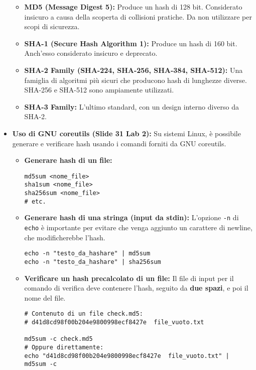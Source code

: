 \begin{itemize}
    \begin{itemize}
        \item \textbf{MD5 (Message Digest 5):} Produce un hash di 128 bit. Considerato insicuro a causa della scoperta di collisioni pratiche. Da non utilizzare per scopi di sicurezza.
        \item \textbf{SHA-1 (Secure Hash Algorithm 1):} Produce un hash di 160 bit. Anch'esso considerato insicuro e deprecato.
        \item \textbf{SHA-2 Family (SHA-224, SHA-256, SHA-384, SHA-512):} Una famiglia di algoritmi più sicuri che producono hash di lunghezze diverse. SHA-256 e SHA-512 sono ampiamente utilizzati.
        \item \textbf{SHA-3 Family:} L'ultimo standard, con un design interno diverso da SHA-2.
    \end{itemize}
    \item \textbf{Uso di GNU coreutils (Slide 31 Lab 2):}
    Su sistemi Linux, è possibile generare e verificare hash usando i comandi forniti da GNU coreutils.
    \begin{itemize}
        \item \textbf{Generare hash di un file:}
\begin{verbatim}
md5sum <nome_file>
sha1sum <nome_file>
sha256sum <nome_file>
# etc.
\end{verbatim}
        \item \textbf{Generare hash di una stringa (input da stdin):}
L'opzione \texttt{-n} di \texttt{echo} è importante per evitare che venga aggiunto un carattere di newline, che modificherebbe l'hash.
\begin{verbatim}
echo -n "testo_da_hashare" | md5sum
echo -n "testo_da_hashare" | sha256sum
\end{verbatim}
        \item \textbf{Verificare un hash precalcolato di un file:}
Il file di input per il comando di verifica deve contenere l'hash, seguito da \textbf{due spazi}, e poi il nome del file.
\begin{verbatim}
# Contenuto di un file check.md5:
# d41d8cd98f00b204e9800998ecf8427e  file_vuoto.txt

md5sum -c check.md5
# Oppure direttamente:
echo "d41d8cd98f00b204e9800998ecf8427e  file_vuoto.txt" | md5sum -c
\end{verbatim}
    \end{itemize}
\end{itemize}

